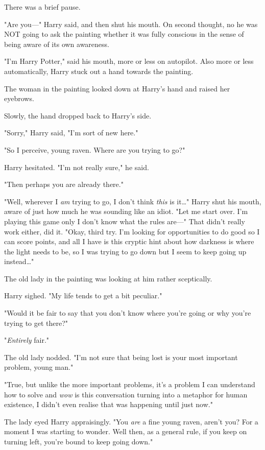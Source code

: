 There was a brief pause.

"Are you---" Harry said, and then shut his mouth. On second thought, no he was
NOT going to ask the painting whether it was fully conscious in the sense of
being aware of its own awareness.

"I'm Harry Potter," said his mouth, more or less on autopilot. Also more or
less automatically, Harry stuck out a hand towards the painting.

The woman in the painting looked down at Harry's hand and raised her eyebrows.

Slowly, the hand dropped back to Harry's side.

"Sorry," Harry said, "I'm sort of new here."

"So I perceive, young raven. Where are you trying to go?"

Harry hesitated. "I'm not really sure," he said.

"Then perhaps you are already there."

"Well, wherever I \emph{am} trying to go, I don't think \emph{this} is
it{\ldots}" Harry shut his mouth, aware of just how much he was sounding like
an idiot. "Let me start over. I'm playing this game only I don't know what the
rules are---" That didn't really work either, did it. "Okay, third try. I'm
looking for opportunities to do good so I can score points, and all I have is
this cryptic hint about how darkness is where the light needs to be, so I was
trying to go down but I seem to keep going up instead{\ldots}"

The old lady in the painting was looking at him rather sceptically.

Harry sighed. "My life tends to get a bit peculiar."

"Would it be fair to say that you don't know where you're going or why you're
trying to get there?"

"\emph{Entirely} fair."

The old lady nodded. "I'm not sure that being lost is your most important
problem, young man."

"True, but unlike the more important problems, it's a problem I can understand
how to solve and \emph{wow} is this conversation turning into a metaphor for
human existence, I didn't even realise that was happening until just now."

The lady eyed Harry appraisingly. "You \emph{are} a fine young raven, aren't
you? For a moment I was starting to wonder. Well then, as a general rule, if
you keep on turning left, you're bound to keep going down."

